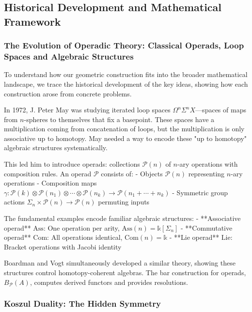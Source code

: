 \subsection{Historical Development and Mathematical Framework}

\subsubsection{The Evolution of Operadic Theory: Classical Operads, Loop Spaces and Algebraic Structures}

To understand how our geometric construction fits into the broader mathematical landscape, we trace the historical development of the key ideas, showing how each construction arose from concrete problems.

In 1972, J. Peter May \cite{May72} was studying iterated loop spaces $\Omega^n\Sigma^n X$—spaces of maps from $n$-spheres to themselves that fix a basepoint. These spaces have a multiplication coming from concatenation of loops, but the multiplication is only associative up to homotopy. May needed a way to encode these "up to homotopy" algebraic structures systematically.

This led him to introduce operads: collections $\mathcal{P}(n)$ of $n$-ary operations with composition rules. An operad $\mathcal{P}$ consists of:
- Objects $\mathcal{P}(n)$ representing $n$-ary operations  
- Composition maps $\gamma: \mathcal{P}(k) \otimes \mathcal{P}(n_1) \otimes \cdots \otimes \mathcal{P}(n_k) \to \mathcal{P}(n_1 + \cdots + n_k)$
- Symmetric group actions $\Sigma_n \times \mathcal{P}(n) \to \mathcal{P}(n)$ permuting inputs

The fundamental examples encode familiar algebraic structures:
- **Associative operad** $\text{Ass}$: One operation per arity, $\text{Ass}(n) = \mathbb{k}[\Sigma_n]$
- **Commutative operad** $\text{Com}$: All operations identical, $\text{Com}(n) = \mathbb{k}$  
- **Lie operad** $\text{Lie}$: Bracket operations with Jacobi identity

Boardman and Vogt \cite{BV73} simultaneously developed a similar theory, showing these structures control homotopy-coherent algebras. The bar construction for operads, $B_{\mathcal{P}}(A)$, computes derived functors and provides resolutions.

\subsubsection{Koszul Duality: The Hidden Symmetry}

